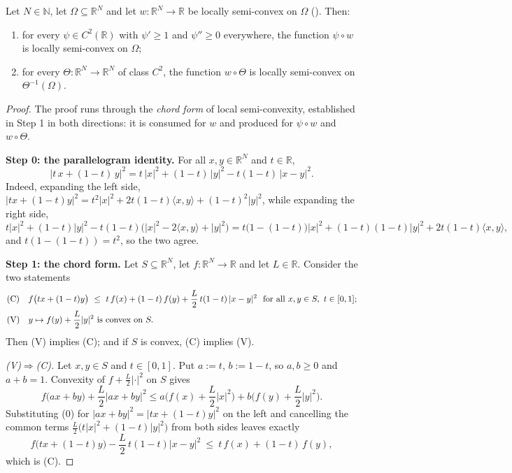 \begin{theorem}
Let $N\in\mathbb N$, let $\Omega\subseteq\mathbb R^{N}$ and let
$w:\mathbb R^{N}\to\mathbb R$ be locally semi-convex on $\Omega$
(). Then:
\begin{enumerate}
\item for every $\psi\in C^{2}(\mathbb R)$ with $\psi'\ge1$ and $\psi''\ge0$ everywhere, the
  function $\psi\circ w$ is locally semi-convex on $\Omega$;
\item for every $\Theta:\mathbb R^{N}\to\mathbb R^{N}$ of class $C^{2}$, the function
  $w\circ\Theta$ is locally semi-convex on $\Theta^{-1}(\Omega)$.
\end{enumerate}
\end{theorem}
\begin{proof}
The proof runs through the \emph{chord form} of local semi-convexity, established in Step 1
in both directions: it is consumed for $w$ and produced for $\psi\circ w$ and
$w\circ\Theta$.

\medskip\noindent\textbf{Step 0: the parallelogram identity.} For all
$x,y\in\mathbb R^{N}$ and $t\in\mathbb R$,
\[
 \big|t\,x+(1-t)\,y\big|^{2}
  =t\,|x|^{2}+(1-t)\,|y|^{2}-t(1-t)\,|x-y|^{2}. \tag{0}
\]
Indeed, expanding the left side, $|tx+(1-t)y|^{2}
=t^{2}|x|^{2}+2t(1-t)\langle x,y\rangle+(1-t)^{2}|y|^{2}$, while expanding the right side,
\[
 t|x|^{2}+(1-t)|y|^{2}-t(1-t)\big(|x|^{2}-2\langle x,y\rangle+|y|^{2}\big)
  =t\big(1-(1-t)\big)|x|^{2}+(1-t)(1-t)|y|^{2}+2t(1-t)\langle x,y\rangle,
\]
and $t(1-(1-t))=t^{2}$, so the two agree.

\medskip\noindent\textbf{Step 1: the chord form.} Let $S\subseteq\mathbb R^{N}$, let
$f:\mathbb R^{N}\to\mathbb R$ and let $L\in\mathbb R$. Consider the two statements
\begin{align}
 &\text{(C)}\quad f\big(tx+(1-t)y\big)\ \le\ t\,f(x)+(1-t)\,f(y)
    +\frac L2\,t(1-t)\,|x-y|^{2}\ \ \text{for all }x,y\in S,\ t\in[0,1];\notag\\
 &\text{(V)}\quad y\mapsto f(y)+\frac L2|y|^{2}\ \text{is convex on }S.\notag
\end{align}
Then (V) implies (C); and if $S$ is convex, (C) implies (V).

\emph{(V)$\Rightarrow$(C).} Let $x,y\in S$ and $t\in[0,1]$. Put $a:=t$, $b:=1-t$, so
$a,b\ge0$ and $a+b=1$. Convexity of $f+\tfrac L2|\cdot|^{2}$ on $S$ gives
\[
 f\big(ax+by\big)+\frac L2\big|ax+by\big|^{2}
  \le a\Big(f(x)+\frac L2|x|^{2}\Big)+b\Big(f(y)+\frac L2|y|^{2}\Big).
\]
Substituting (0) for $|ax+by|^{2}=|tx+(1-t)y|^{2}$ on the left and cancelling the common
terms $\tfrac L2\big(t|x|^{2}+(1-t)|y|^{2}\big)$ from both sides leaves exactly
\[
 f\big(tx+(1-t)y\big)-\frac L2\,t(1-t)|x-y|^{2}\ \le\ t\,f(x)+(1-t)\,f(y),
\]
which is (C).


\end{proof}
